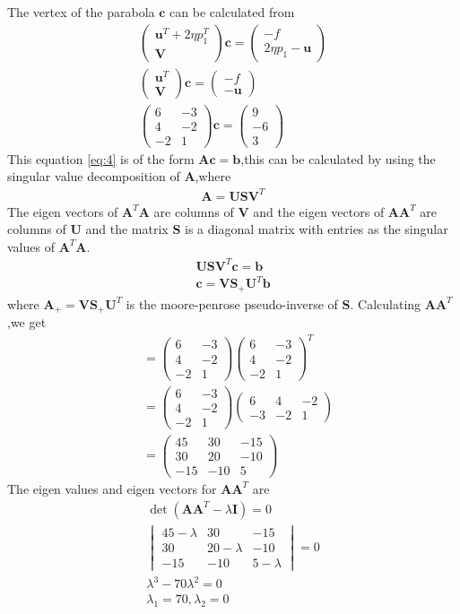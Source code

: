\documentclass[journal,12pt,twocolumn]{IEEEtran}
\providecommand{\brak}[1]{\ensuremath{\left(#1\right)}}
\newcommand{\myvec}[1]{\ensuremath{\begin{pmatrix}#1\end{pmatrix}}}
\numberwithin{equation}{subsection}
\let\vec\mathbf
\begin{document}
The vertex of the parabola $\vec{c}$ can be calculated from
\begin{align}
    \myvec{\vec{u}^T+2\eta p_1^T\\\vec{V}}\vec{c}=\myvec{-f\\2\eta p_1-\vec{u}}\\
    \myvec{\vec{u}^T\\\vec{V}}\vec{c}=\myvec{-f\\-\vec{u}}\\
    \myvec{6&-3\\4&-2\\-2&1}\vec{c}=\myvec{9\\-6\\3}\label{eq:4}
\end{align}
This equation \eqref{eq:4} is of the form $\vec{A}\vec{c}=\vec{b}$,this can be calculated by using the singular value decomposition of $\vec{A}$,where
\begin{align}
    \vec{A}=\vec{U}\vec{S}\vec{V}^T
\end{align}
The eigen vectors of $\vec{A}^T\vec{A}$ are columns of $\vec{V}$ and the eigen vectors of $\vec{A}\vec{A}^T$ are columns of $\vec{U}$ and the matrix $\vec{S}$ is a diagonal matrix with entries as the singular values of $\vec{A}^T\vec{A}$.
\begin{align}
    \vec{U}\vec{S}\vec{V}^T\vec{c}=\vec{b}\\
    \vec{c}=\vec{V}\vec{S}_+\vec{U}^T\vec{b}
\end{align}
where $\vec{A}_+=\vec{V}\vec{S}_+\vec{U}^T$ is the moore-penrose pseudo-inverse of $\vec{S}$.
Calculating $\vec{A}\vec{A}^T$,we get
\begin{align}
    &=\myvec{6&-3\\4&-2\\-2&1}\myvec{6&-3\\4&-2\\-2&1}^T\\
    &=\myvec{6&-3\\4&-2\\-2&1}\myvec{6&4&-2\\-3&-2&1}\\
    &=\myvec{45&30&-15\\30&20&-10\\-15&-10&5}
\end{align}
The eigen values and eigen vectors for $\vec{A}\vec{A}^T$ are
\begin{align}
    \det \brak{\vec{A}\vec{A}^T-\lambda\vec{I}}=0\\
    \begin{vmatrix}45-\lambda&30&-15\\30&20-\lambda&-10\\-15&-10&5-\lambda\end{vmatrix}=0\\
    \lambda^3-70\lambda^2=0\\
    \lambda_1=70,\lambda_2=0
\end{align}
\end{document}
